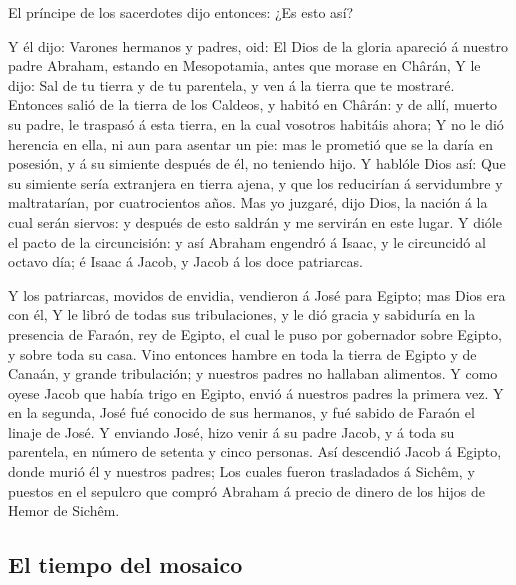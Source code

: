  El príncipe de los sacerdotes dijo entonces: ¿Es esto así?

 Y él dijo: Varones hermanos y padres, oid: El Dios de la
gloria apareció á nuestro padre Abraham, estando en Mesopotamia, antes
que morase en Chârán,  Y le dijo: Sal de tu tierra y de tu
parentela, y ven á la tierra que te mostraré.  Entonces
salió de la tierra de los Caldeos, y habitó en Chârán: y de allí, muerto
su padre, le traspasó á esta tierra, en la cual vosotros habitáis ahora;
 Y no le dió herencia en ella, ni aun para asentar un pie:
mas le prometió que se la daría en posesión, y á su simiente después de
él, no teniendo hijo.  Y hablóle Dios así: Que su simiente
sería extranjera en tierra ajena, y que los reducirían á servidumbre y
maltratarían, por cuatrocientos años.  Mas yo juzgaré, dijo
Dios, la nación á la cual serán siervos: y después de esto saldrán y me
servirán en este lugar.  Y dióle el pacto de la
circuncisión: y así Abraham engendró á Isaac, y le circuncidó al octavo
día; é Isaac á Jacob, y Jacob á los doce patriarcas.

 Y los patriarcas, movidos de envidia, vendieron á José para
Egipto; mas Dios era con él,  Y le libró de todas sus
tribulaciones, y le dió gracia y sabiduría en la presencia de Faraón,
rey de Egipto, el cual le puso por gobernador sobre Egipto, y sobre toda
su casa.  Vino entonces hambre en toda la tierra de Egipto
y de Canaán, y grande tribulación; y nuestros padres no hallaban
alimentos.  Y como oyese Jacob que había trigo en Egipto,
envió á nuestros padres la primera vez.  Y en la segunda,
José fué conocido de sus hermanos, y fué sabido de Faraón el linaje de
José.  Y enviando José, hizo venir á su padre Jacob, y á
toda su parentela, en número de setenta y cinco personas. 
Así descendió Jacob á Egipto, donde murió él y nuestros padres;
 Los cuales fueron trasladados á Sichêm, y puestos en el
sepulcro que compró Abraham á precio de dinero de los hijos de Hemor de
Sichêm.

\hypertarget{el-tiempo-del-mosaico}{%
\subsection{El tiempo del mosaico}\label{el-tiempo-del-mosaico}}

